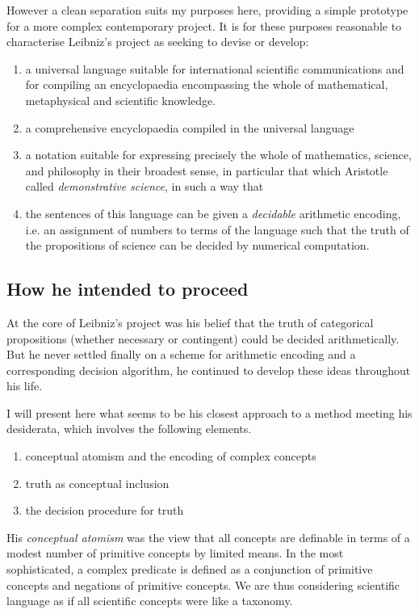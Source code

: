 However a clean separation suits my purposes here, providing a simple prototype
for a more complex contemporary project.
It is for these purposes reasonable to characterise Leibniz's project as seeking
to devise or develop:

\begin{enumerate}
\item a universal language suitable for international scientific communications and for
compiling an encyclopaedia encompassing the whole of mathematical,
metaphysical and scientific knowledge.
\item a comprehensive encyclopaedia compiled in the universal language
\item a notation suitable for expressing precisely the whole of mathematics, science,
and philosophy in their broadest sense, in particular that which Aristotle called
\emph{demonstrative science}, in such a way that
\item the sentences of this language can be given a \emph{decidable} arithmetic encoding,
i.e. an assignment of numbers to terms of the language such that the truth of the
propositions of science can be decided by numerical computation.
\end{enumerate}

\subsection{How he intended to proceed}

At the core of Leibniz's project was his belief that the truth of categorical
propositions (whether necessary or contingent) could be decided arithmetically.
But he never settled finally on a scheme for arithmetic encoding and a corresponding
decision algorithm, he continued to develop these ideas throughout his life.

I will present here what seems to be his closest approach to a method meeting his
desiderata, which involves the following elements.

\begin{enumerate}
\item conceptual atomism and the encoding of complex concepts
\item truth as conceptual inclusion
\item the decision procedure for truth
\end{enumerate}

His \emph{conceptual atomism} was the view that all concepts are definable in terms
of a modest number of primitive concepts by limited means.
In the most sophisticated, a complex predicate is defined as a conjunction of primitive
concepts and negations of primitive concepts.
We are thus considering scientific language as if all scientific concepts were like a taxonomy.

